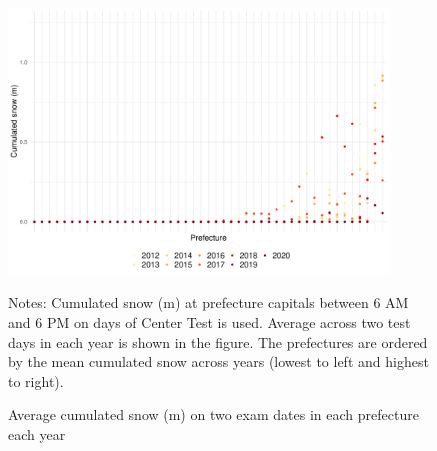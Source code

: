 \documentclass[12pt,letterpaper]{article}
\begin{document}
\begin{figure}[H]
  \centering
  \caption{Average cumulated snow (m) on two exam dates in each prefecture each year}
  \includegraphics[width = 0.9\textwidth]{../Output/images/cum_snow_diff.pdf}
  \label{fig:cum_snow_diff}
  \footnotesize
  \begin{tablenotes}
    \item Notes:
      Cumulated snow (m) at prefecture capitals between 6 AM and 6 PM on days of Center Test is used.
      Average across two test days in each year is shown in the figure.
      The prefectures are ordered by the mean cumulated snow across years (lowest to left and highest to right).
  \end{tablenotes}
\end{figure}
\end{document}
